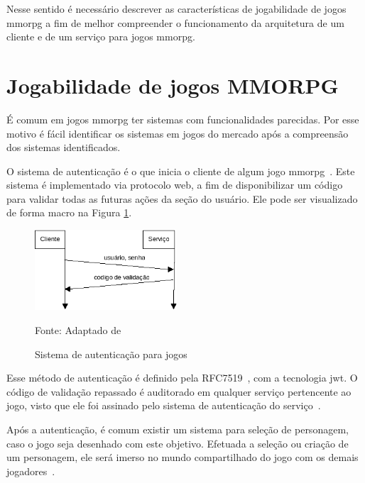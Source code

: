 Nesse sentido é necessário descrever as características de jogabilidade de jogos \ac{mmorpg} a fim de melhor compreender o funcionamento da arquitetura de um cliente e de um serviço para jogos \ac{mmorpg}.



\section{Jogabilidade de jogos MMORPG}
\label{sec:jogabilidade}



É comum em jogos \ac{mmorpg} ter sistemas com funcionalidades parecidas.
%
Por esse motivo é fácil identificar os sistemas em jogos do mercado após a compreensão dos sistemas identificados.



O sistema de autenticação é o que inicia o cliente de algum jogo \ac{mmorpg}~\cite{albion_online_unite, matthiasrudy2011}.
%
Este sistema é implementado via protocolo web, a fim de disponibilizar um código para validar todas as futuras ações da seção do usuário.
%
Ele pode ser visualizado de forma macro na Figura \ref{fig:autenticacao}.


\begin{figure}[htb!]
\caption{Sistema de autenticação para jogos}
\label{fig:autenticacao}
\includegraphics[height=3cm]{img/cap2/autenticacao.png}
\centering

Fonte: Adaptado de ~\cite{LeckyThompson2008Nov}
\end{figure}



Esse método de autenticação é definido pela RFC7519~\cite{rfc7519}, com a tecnologia \ac{jwt}.
%
O código de validação repassado é auditorado em qualquer serviço pertencente ao jogo, visto que ele foi assinado pelo sistema de autenticação do serviço~\cite{Ikem2018May}.


Após a autenticação, é comum existir um sistema para seleção de personagem, caso o jogo seja desenhado com este objetivo.
%
Efetuada a seleção ou criação de um personagem, ele será imerso no mundo compartilhado do jogo com os demais jogadores~\cite{matthiasrudy2011}.



